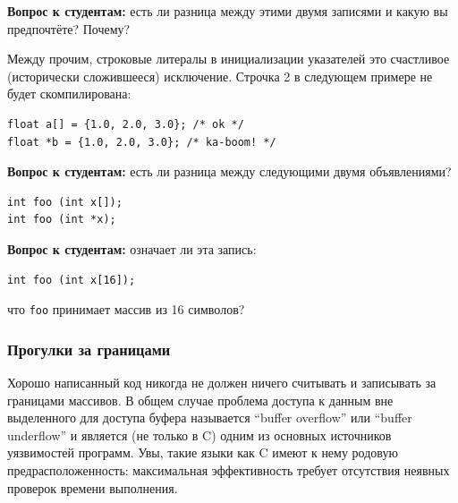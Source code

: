 \documentclass[a4paper,12pt,oneside]{article}
\newif\ifanswers
\begin{document}
\textbf{Вопрос к студентам:} есть ли разница между этими двумя записями и какую вы предпочтёте? Почему?

\ifanswers
Верный ответ: строчка 1 предпочтительней, чем (устаревшая, с Wall + Werror выдаст ``error: deprecated conversion from string constant to \lstinline!char*!'') строчка 2 и они имеют разную семантику. Память под массивы выделяется автоматически (и строчка 1 подразумевает неявный memset) но память никогда автоматически не выделяется под указатели, поэтому для построения динамических структур данных (например, связных списков) используются указатели, а не массивы.
\fi

Между прочим, строковые литералы в инициализации указателей это счастливое (исторически сложившееся) исключение. Строчка 2 в следующем примере не будет скомпилирована:

\begin{lstlisting}
float a[] = {1.0, 2.0, 3.0}; /* ok */
float *b = {1.0, 2.0, 3.0}; /* ka-boom! */
\end{lstlisting}

\textbf{Вопрос к студентам:} есть ли разница между следующими двумя объявлениями?

\begin{lstlisting}
int foo (int x[]);
int foo (int *x);
\end{lstlisting}

\ifanswers
Ответ: из-за decaying разницы нет.
\fi

\textbf{Вопрос к студентам:} означает ли эта запись:

\begin{lstlisting}
int foo (int x[16]);
\end{lstlisting}

что \lstinline!foo! принимает массив из 16 символов?

\ifanswers
Ответ: нет, здесь \lstinline!foo! принимает любой указатель.
\fi

\subsubsection{Прогулки за границами}\label{subsub:overruns}

Хорошо написанный код никогда не должен ничего считывать и записывать за границами массивов. В общем случае проблема доступа к данным вне выделенного для доступа буфера называется ``buffer overflow'' или ``buffer underflow'' и является (не только в C) одним из основных источников уязвимостей программ. Увы, такие языки как C имеют к нему родовую предрасположенность: максимальная эффективность требует отсутствия неявных проверок времени выполнения.
\end{document}
